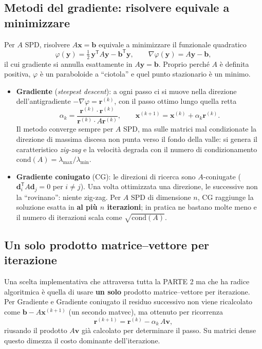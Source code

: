 \documentclass[11pt,a4paper]{article}
\begin{document}
\subsection{Metodi del gradiente: risolvere equivale a minimizzare}
Per $A$ SPD, risolvere $A\mathbf{x}=\mathbf{b}$ equivale a minimizzare il
funzionale quadratico
\[
  \varphi(\mathbf{y}) = \tfrac12\,\mathbf{y}^{\mathsf{T}}A\mathbf{y}
                        - \mathbf{b}^{\mathsf{T}}\mathbf{y},
  \qquad
  \nabla\varphi(\mathbf{y}) = A\mathbf{y}-\mathbf{b},
\]
il cui gradiente si annulla esattamente in $A\mathbf{y}=\mathbf{b}$. Proprio
perché $A$ è definita positiva, $\varphi$ è un paraboloide a ``ciotola'' e quel
punto stazionario è un minimo.

\begin{itemize}[leftmargin=1.6em]
  \item \textbf{Gradiente} (\emph{steepest descent}): a ogni passo ci si muove
  nella direzione dell'antigradiente $-\nabla\varphi=\mathbf{r}^{(k)}$, con il
  passo ottimo lungo quella retta
  \[
    \alpha_k = \frac{\mathbf{r}^{(k)}\!\cdot\mathbf{r}^{(k)}}
                    {\mathbf{r}^{(k)}\!\cdot A\mathbf{r}^{(k)}},
    \qquad
    \mathbf{x}^{(k+1)}=\mathbf{x}^{(k)}+\alpha_k\mathbf{r}^{(k)}.
  \]
  Il metodo converge sempre per $A$ SPD, ma sulle matrici mal condizionate la
  direzione di massima discesa non punta verso il fondo della valle: si genera il
  caratteristico \emph{zig-zag} e la velocità degrada con il numero di
  condizionamento $\mathrm{cond}(A)=\lambda_{\max}/\lambda_{\min}$.
  \item \textbf{Gradiente coniugato} (CG): le direzioni di ricerca sono
  $A$-coniugate ($\mathbf{d}_i^{\mathsf{T}}A\mathbf{d}_j=0$ per $i\neq j$). Una
  volta ottimizzata una direzione, le successive non la ``rovinano'': niente
  zig-zag. Per $A$ SPD di dimensione $n$, CG raggiunge la soluzione esatta in
  \textbf{al più $n$ iterazioni}; in pratica ne bastano molte meno e il numero di
  iterazioni scala come $\sqrt{\mathrm{cond}(A)}$.
\end{itemize}

\subsection{Un solo prodotto matrice--vettore per iterazione}
Una scelta implementativa che attraversa tutta la PARTE 2 ma che ha radice
algoritmica è quella di usare \textbf{un solo} prodotto matrice--vettore per
iterazione. Per Gradiente e Gradiente coniugato il residuo successivo non viene
ricalcolato come $\mathbf{b}-A\mathbf{x}^{(k+1)}$ (un secondo matvec), ma ottenuto
per ricorrenza
\[
  \mathbf{r}^{(k+1)} = \mathbf{r}^{(k)} - \alpha_k\, A\mathbf{v},
\]
riusando il prodotto $A\mathbf{v}$ già calcolato per determinare il passo. Su
matrici dense questo dimezza il costo dominante dell'iterazione.
\end{document}
